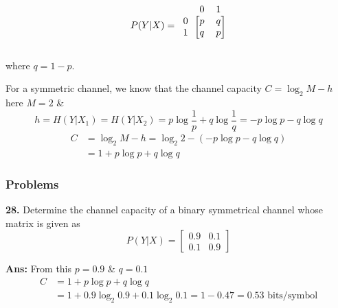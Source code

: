 \documentclass[12pt]{article}
\begin{document}
\begin{minipage}{.3\linewidth}
$$P(Y|X) = \begin{blockarray}{ccc}
 & 0 & 1\\
\begin{block}{c[cc]}
0 & p & q \\
1 & q & p \\
\end{block}
\end{blockarray}$$
\end{minipage}%
\hfill
\begin{minipage}{.5\linewidth}
\centering
{}
\end{minipage}

where $q = 1 - p$.

For a symmetric channel, we know that the channel capacity $C = \log_2 M - h$ here $M=2$ \& 
$$h = H(Y|X_1) = H(Y|X_2) = p \log \frac{1}{p} + q \log \frac{1}{q} = -p \log p - q \log q$$ 
\begin{align*}
C &= \log_2 M - h = \log_2 2 - (-p \log p - q \log q) \\
&= 1 + p \log p + q \log q
\end{align*} 

\subsubsection*{Problems}
\textbf{28.} Determine the channel capacity of a binary symmetrical channel whose matrix is given as 
$$P(Y|X) = \begin{bmatrix}
0.9 & 0.1 \\ 
0.1 & 0.9
\end{bmatrix}$$ 

\textbf{Ans:}
From this $p=0.9$ \& $q = 0.1$ 
\begin{align*}
C &= 1 + p \log p + q \log q \\
&= 1 + 0.9 \log_2 0.9 + 0.1 \log_2 0.1 = 1 - 0.47 = 0.53 \text{ bits/symbol}
\end{align*} 
\end{document}

